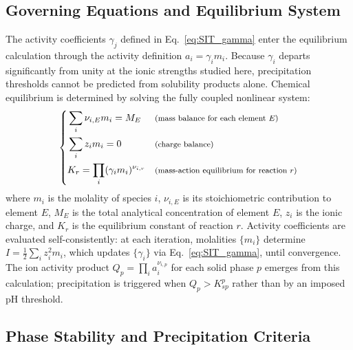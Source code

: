 \documentclass[final,2p,times]{elsarticle}
\begin{document}

\subsection{Governing Equations and Equilibrium System}

The activity coefficients $\gamma_j$ defined in Eq.~\ref{eq:SIT_gamma} enter the equilibrium calculation through the activity definition $a_i = \gamma_i m_i$. Because $\gamma_i$ departs significantly from unity at the ionic strengths studied here, precipitation thresholds cannot be predicted from solubility products alone. Chemical equilibrium is determined by solving the fully coupled nonlinear system:
\begin{equation}\label{eq:equil_system}
\left\{
\begin{aligned}
&\sum_{i} \nu_{i,E} m_i = M_E
&& \footnotesize{\text{(mass balance for each element $E$)}} \\
&\sum_i z_i m_i = 0
&& \footnotesize{\text{(charge balance)}} \\
&K_r = \prod_i (\gamma_i m_i)^{\nu_{i,r}}
&& \footnotesize{\text{(mass-action equilibrium for reaction $r$)}}
\end{aligned}
\right.
\end{equation}
\noindent
where $m_i$ is the molality of species $i$, $\nu_{i,E}$ is its stoichiometric contribution to element $E$, $M_E$ is the total analytical concentration of element $E$, $z_i$ is the ionic charge, and $K_r$ is the equilibrium constant of reaction $r$. Activity coefficients are evaluated self-consistently: at each iteration, molalities $\{m_i\}$ determine $I = \tfrac{1}{2}\sum_i z_i^2 m_i$, which updates $\{\gamma_i\}$ via Eq.~\ref{eq:SIT_gamma}, until convergence. The ion activity product $Q_p = \prod_i a_i^{\nu_{i,p}}$ for each solid phase $p$ emerges from this calculation; precipitation is triggered when $Q_p > K_{sp}^p$ rather than by an imposed pH threshold.
\subsection{Phase Stability and Precipitation Criteria}
\end{document}
